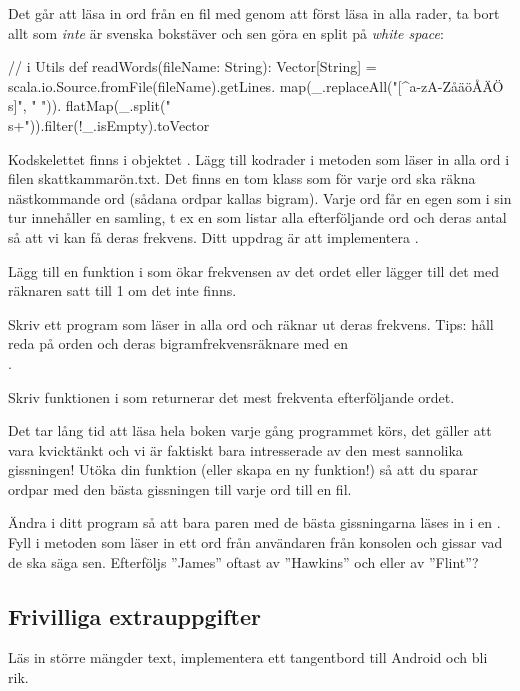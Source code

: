 \Subtask Det går att läsa in ord från en fil med  genom att först läsa in alla rader, ta bort allt som {\em inte} är svenska bokstäver och sen göra en split på \emph{white space}: 
\begin{CodeSmall}
// i Utils
def readWords(fileName: String): Vector[String] = {
	   scala.io.Source.fromFile(fileName).getLines.
	   map(_.replaceAll("[^a-zA-ZåäöÅÄÖ\\s]", " ")).
	   flatMap(_.split("\\s+")).filter(!_.isEmpty).toVector
	}
\end{CodeSmall}

Kodskelettet finns i objektet . Lägg till kodrader i metoden  som läser in alla ord i filen skattkammarön.txt. Det finns en tom klass  som för varje ord ska räkna nästkommande ord (sådana ordpar kallas bigram). Varje ord får en egen  som i sin tur innehåller en samling, t ex en  som listar alla efterföljande ord och deras antal så att vi kan få deras frekvens. Ditt uppdrag är att implementera .

\Subtask Lägg till en funktion  i  som ökar frekvensen av det ordet  eller lägger till det med räknaren satt till 1 om det inte finns. 

\Subtask Skriv ett program som läser in alla ord och räknar ut deras frekvens. Tips: håll reda på orden och deras bigramfrekvensräknare med en \\
.

\Subtask Skriv funktionen  i  som returnerar det mest frekventa efterföljande ordet. 

\Subtask Det tar lång tid att läsa hela boken varje gång programmet körs, det gäller att vara kvicktänkt och vi är faktiskt bara intresserade av den mest sannolika gissningen! Utöka din funktion  (eller skapa en ny funktion!) så att du sparar ordpar  med den bästa gissningen till varje ord till en fil. 

\Subtask Ändra i ditt program så att bara paren med de bästa gissningarna läses in i en . Fyll i metoden  som läser in ett ord från användaren från konsolen och gissar vad de ska säga sen. Efterföljs ''James'' oftast av ''Hawkins'' och eller av ''Flint''?




\subsection{Frivilliga extrauppgifter}

\Task Läs in större mängder text, implementera ett tangentbord till Android och bli rik.


    